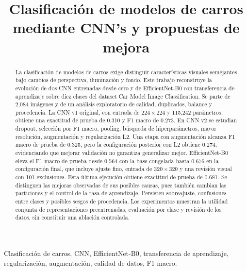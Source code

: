 \documentclass[conference]{IEEEtran}
\begin{document}
\title{Clasificación de modelos de carros mediante CNN's y propuestas de mejora}

\author{
}

\maketitle

\begin{abstract}
La clasificación de modelos de carros exige distinguir características visuales semejantes bajo cambios de perspectiva, iluminación y fondo. Este trabajo reconstruye la evolución de dos CNN entrenadas desde cero y de EfficientNet-B0 con transferencia de aprendizaje sobre diez clases del dataset Car Model Image Classification. Se parte de 2,084 imágenes y de un análisis exploratorio de calidad, duplicados, balance y procedencia. La CNN v1 original, con entrada de $224\times224$ y 115,242 parámetros, obtiene una exactitud de prueba de 0.310 y F1 macro de 0.273. En CNN v2 se estudian dropout, selección por F1 macro, pooling, búsqueda de hiperparámetros, mayor resolución, augmentación y regularización L2. Una etapa con augmentación alcanza F1 macro de prueba de 0.325, pero la configuración posterior con L2 obtiene 0.274, evidenciando que mejorar validación no garantiza generalizar mejor. EfficientNet-B0 eleva el F1 macro de prueba desde 0.564 con la base congelada hasta 0.676 en la configuración final, que incluye ajuste fino, entrada de $320\times320$ y una revisión visual con 101 exclusiones. Esta última ejecución obtiene exactitud de prueba de 0.681. Se distinguen las mejoras observadas de sus posibles causas, pues también cambian las particiones y el control de la tasa de aprendizaje. Persisten sobreajuste, confusiones entre clases y posibles sesgos de procedencia. Los experimentos muestran la utilidad conjunta de representaciones preentrenadas, evaluación por clase y revisión de los datos, sin constituir una ablación controlada.
\end{abstract}

\begin{IEEEkeywords}
Clasificación de carros, CNN, EfficientNet-B0, transferencia de aprendizaje, regularización, augmentación, calidad de datos, F1 macro.
\end{IEEEkeywords}
\end{document}
